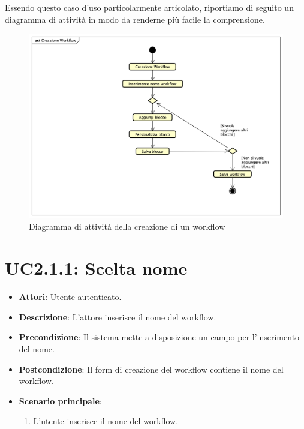 Essendo questo caso d'uso particolarmente articolato, riportiamo di seguito un diagramma di attività in modo da renderne più facile la comprensione.

\begin{figure}[ht]
	\centering
	\includegraphics[scale=0.4]{./Diagram/CreazioneWorkflow.png}
	\caption{Diagramma di attività della creazione di un workflow}\label{}
\end{figure}



\section{UC2.1.1: Scelta nome}
\label{UC2.1.1}

\begin{itemize}
	\item \textbf{Attori}: Utente autenticato.
	\item \textbf{Descrizione}: L'attore inserisce il nome del workflow.
	\item \textbf{Precondizione}: Il sistema mette a disposizione un campo per l'inserimento del nome.
	\item \textbf{Postcondizione}: Il form di creazione del workflow contiene il nome del workflow.
	\item \textbf{Scenario principale}:
	\begin{enumerate} \item L'utente inserisce il nome del workflow.\end{enumerate}
\end{itemize}

